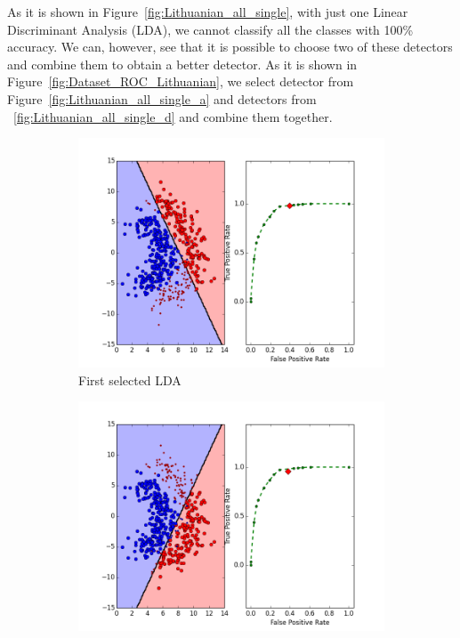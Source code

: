 As it is shown in Figure~\ref{fig:Lithuanian_all_single}, with just one  Linear Discriminant Analysis (LDA), we cannot classify all the classes with 100\% accuracy. We can, however, see that it is possible to choose two of these detectors and combine them to obtain a better detector. As it is shown in Figure~\ref{fig:Dataset_ROC_Lithuanian}, we select detector from Figure~\ref{fig:Lithuanian_all_single_a}  and detectors from ~\ref{fig:Lithuanian_all_single_d} and combine them together.

\begin{figure}[H]
    \centering
    \begin{adjustbox}{minipage=\linewidth,scale=1.1}
    \begin{subfigure}[b]{0.5\columnwidth}
        \centering
        \includegraphics[width=\linewidth]{figs/Lithuanian/20Dataset-ROC}
        \caption{First selected LDA}
        \label{fig:Dataset_ROC_Lithuanian_a} 
    \end{subfigure}
    \begin{subfigure}[b]{0.5\columnwidth}
        \centering
        \includegraphics[width=\linewidth]{figs/Lithuanian/65Dataset-ROC}

\end{subfigure}
\end{adjustbox}
\end{figure}
